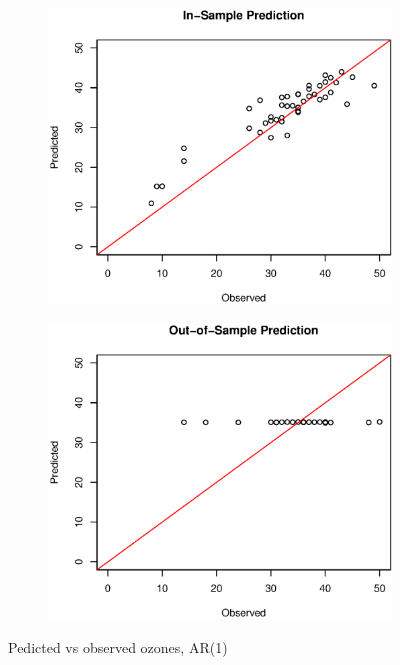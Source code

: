 \documentclass[12pt]{article}
\begin{document}
\begin{figure}[H]
\centering
\begin{subfigure}{.5\textwidth}
	\centering
	\includegraphics[scale = 0.4]{pred_in_ar.eps}
	\caption{}
\end{subfigure}%
\begin{subfigure}{.5\textwidth}
	\centering
	\includegraphics[scale = 0.4]{pred_out_ar.eps}
	\caption{}
\end{subfigure}
\caption{Pedicted vs observed ozones, AR(1)}
\end{figure}
\end{document}
